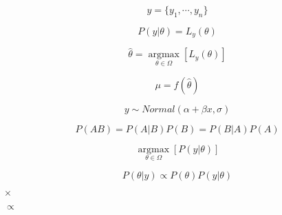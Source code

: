 \documentclass[10pt]{book}
\begin{document}
\begin{mdSnippets}
\begin{mdDisplaySnippet}[b36554b7cd0158b5e6bb9f2386037fca]%
\[%
  y = \{ y_1, \cdots, y_n \}
\]%
\end{mdDisplaySnippet}%
\begin{mdDisplaySnippet}%
\[%
  P(y|\theta) = L_y(\theta)
\]%
\end{mdDisplaySnippet}%
\begin{mdDisplaySnippet}[41e8f79e0d477d95ab629630bf5ff9ef]%
\[%
  \hat{\theta} =\underset{\theta \in \Omega}{\operatorname{arg max}} \left [ L_y(\theta) \right ]
\]%
\end{mdDisplaySnippet}%
\begin{mdDisplaySnippet}[bbf6ef54e9f1b812420b9e6921f55f03]%
\[%
  \mu = f(\hat{\theta}) 
\]%
\end{mdDisplaySnippet}%
\begin{mdDisplaySnippet}[8ba768b32e5747c57dfd9f35502d268a]%
\[%
y \sim Normal(\alpha + \beta x, \sigma)
\]%
\end{mdDisplaySnippet}%
\begin{mdDisplaySnippet}%
\[%
P(AB) = P(A|B)P(B) = P(B|A)P(A)
\]%
\end{mdDisplaySnippet}%
\begin{mdDisplaySnippet}[b8db3485c472a98ad67c3f08fe8e7e27]%
\[%
\underset{\theta \in \Omega}{\operatorname{arg max}} \left [ P(y|\theta) \right ]
\]%
\end{mdDisplaySnippet}%
\begin{mdDisplaySnippet}%
\[%
P(\theta|y) \propto P(\theta)P(y|\theta)
\]%
\end{mdDisplaySnippet}%
\begin{mdInlineSnippet}[60c13e05d3ec8c10b8564eae7023d9db]%
{$\times$}\end{mdInlineSnippet}%
\begin{mdInlineSnippet}[185f55ddfbc1363d6514b54225d47da8]%
{$\propto$}\end{mdInlineSnippet}%

\end{mdSnippets}
\end{document}
